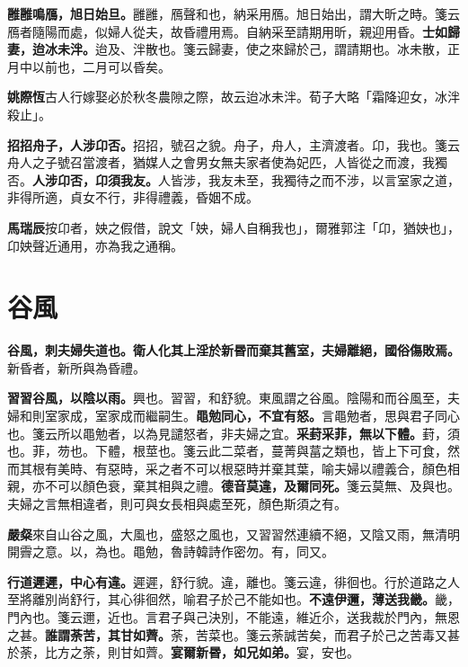 \textbf{雝雝鳴鴈，旭日始旦。}{\footnotesize 雝雝，鴈聲和也，納采用鴈。旭日始出，謂大昕之時。箋云鴈者隨陽而處，似婦人從夫，故昏禮用焉。自納采至請期用昕，親迎用昏。}\textbf{士如歸妻，迨冰未泮。}{\footnotesize 迨及、泮散也。箋云歸妻，使之來歸於己，謂請期也。冰未散，正月中以前也，二月可以昏矣。}

\begin{quoting}\textbf{姚際恆}古人行嫁娶必於秋冬農隙之際，故云迨冰未泮。荀子大略「霜降迎女，冰泮殺止」。\end{quoting}

\textbf{招招舟子，人涉卬否。}{\footnotesize 招招，號召之貌。舟子，舟人，主濟渡者。卬，我也。箋云舟人之子號召當渡者，猶媒人之會男女無夫家者使為妃匹，人皆從之而渡，我獨否。}\textbf{人涉卬否，卬須我友。}{\footnotesize 人皆涉，我友未至，我獨待之而不涉，以言室家之道，非得所適，貞女不行，非得禮義，昏姻不成。}

\begin{quoting}\textbf{馬瑞辰}按卬者，姎之假借，說文「姎，婦人自稱我也」，爾雅郭注「卬，猶姎也」，卬姎聲近通用，亦為我之通稱。\end{quoting}

\section{谷風}


\textbf{谷風，刺夫婦失道也。衛人化其上淫於新昬而棄其舊室，夫婦離絕，國俗傷敗焉。}{\footnotesize 新昏者，新所與為昏禮。}

\textbf{習習谷風，以陰以雨。}{\footnotesize 興也。習習，和舒貌。東風謂之谷風。陰陽和而谷風至，夫婦和則室家成，室家成而繼嗣生。}\textbf{黽勉同心，不宜有怒。}{\footnotesize 言黽勉者，思與君子同心也。箋云所以黽勉者，以為見譴怒者，非夫婦之宜。}\textbf{采葑采菲，無以下體。}{\footnotesize 葑，須也。菲，芴也。下體，根莖也。箋云此二菜者，蔓菁與葍之類也，皆上下可食，然而其根有美時、有惡時，采之者不可以根惡時并棄其葉，喻夫婦以禮義合，顏色相親，亦不可以顏色衰，棄其相與之禮。}\textbf{德音莫違，及爾同死。}{\footnotesize 箋云莫無、及與也。夫婦之言無相違者，則可與女長相與處至死，顏色斯須之有。}

\begin{quoting}\textbf{嚴粲}來自山谷之風，大風也，盛怒之風也，又習習然連續不絕，又陰又雨，無清明開霽之意。以，為也。黽勉，魯詩韓詩作密勿。有，同又。\end{quoting}

\textbf{行道遲遲，中心有違。}{\footnotesize 遲遲，舒行貌。違，離也。箋云違，徘徊也。行於道路之人至將離別尚舒行，其心徘徊然，喻君子於己不能如也。}\textbf{不遠伊邇，薄送我畿。}{\footnotesize 畿，門內也。箋云邇，近也。言君子與己決別，不能遠，維近尒，送我裁於門內，無恩之甚。}\textbf{誰謂荼苦，其甘如薺。}{\footnotesize 荼，苦菜也。箋云荼誠苦矣，而君子於己之苦毒又甚於荼，比方之荼，則甘如薺。}\textbf{宴爾新昬，如兄如弟。}{\footnotesize 宴，安也。}

